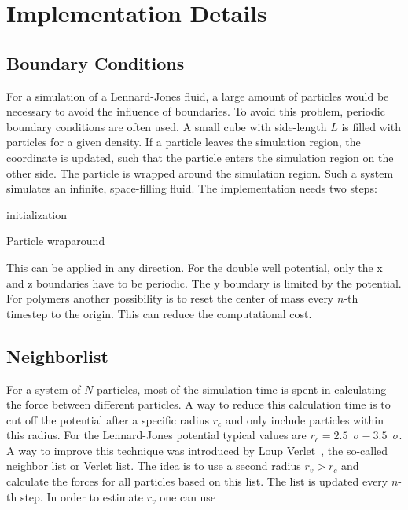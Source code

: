 \documentclass[a4paper]{article}
\begin{document}
\section{Implementation Details}
\label{sec:implementation}

\subsection{Boundary Conditions}

For a simulation of a Lennard-Jones fluid, a  large amount of particles would be necessary to avoid the influence of boundaries. To avoid this problem, periodic boundary conditions are often used. A small cube with side-length $L$ is filled with particles for a given density. If a particle leaves the simulation region, the coordinate is updated, such that the particle enters the simulation region on the other side. The particle is wrapped around the simulation region. Such a system simulates an infinite, space-filling fluid. The implementation needs two steps:

\vspace{12pt}

\begin{algorithm}[H]
 initialization\;
 \caption{Particle wraparound}
 \label{alg:wraparound}
\end{algorithm}

\vspace{12pt}

This can be applied in any direction. For the double well potential, only the x and z boundaries have to be periodic. The y boundary is limited by the potential. For polymers another possibility is to reset the center of mass every $n$-th timestep to the origin. This can reduce the computational cost.

\subsection{Neighborlist}

For a system of $N$ particles, most of the simulation time is spent in calculating the force between different particles. A way to reduce this calculation time is to cut off the potential after a specific radius $r_c$ and only include particles within this radius. For the Lennard-Jones potential typical values are $r_c = 2.5 \enspace \sigma - 3.5\enspace \sigma$. A way to improve this technique was introduced by Loup Verlet~\cite{Verlet1967}, the so-called neighbor list or Verlet list. The idea is to use a second radius $r_v > r_c$  and calculate the forces for all particles based on this list. The list is updated every $n$-th step. In order to estimate $r_v$ one can use
\end{document}
